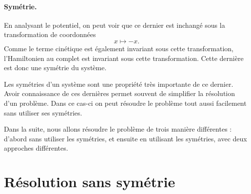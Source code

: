 \documentclass[11pt,a4paper,oneside]{article}
\begin{document}
\paragraph*{Symétrie.} En analysant le potentiel, on peut voir que ce dernier est inchangé sous la transformation de coordonnées
\begin{equation}
    x\mapsto-x.
\end{equation}
Comme le terme cinétique est également invariant sous cette transformation, l'Hamiltonien au complet est invariant sous cette transformation. Cette dernière est donc une symétrie du système.

Les symétries d'un système sont une propriété très importante de ce dernier. Avoir connaissance de ces dernières permet souvent de simplifier la résolution d'un problème. Dans ce cas-ci on peut résoudre le problème tout aussi facilement sans utiliser ses symétries.

Dans la suite, nous allons résoudre le problème de trois manière différentes : d'abord sans utiliser les symétries, et ensuite en utilisant les symétries, avec deux approches différentes.

\section{Résolution sans symétrie}
\end{document}
